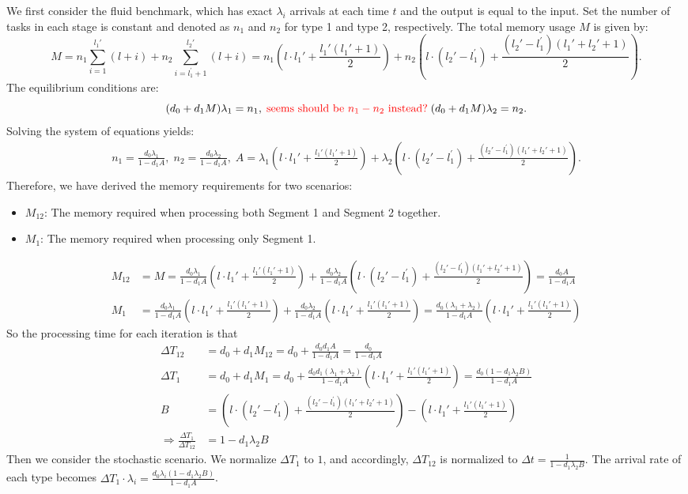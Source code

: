 \documentclass[opre, nonblindrev]{informs3} %
\begin{document}
We first consider the fluid benchmark, which has exact $\lambda_i$ arrivals at each time $t$ and the
output is equal to the input. Set the number of tasks in each stage is constant and denoted as $n_1$ and $n_2$ for type 1 and type 2, respectively. The total memory usage $M$ is given by:
$$M = n_1 \sum_{i=1}^{l_1'} (l + i) + n_2 \sum_{i=l_1^{\prime}+1}^{l_2'} (l + i) = n_1 \left( l \cdot l_1' + \frac{l_1' (l_1' + 1)}{2} \right) + n_2 \left( l\cdot( l_2'-l_1^{\prime}) + \frac{(l_2'-l_1^{\prime} ) (l_1'+l_2' + 1)}{2} \right).$$
The equilibrium conditions are:
$$(d_0 + d_1 M) \lambda_1 = n_1,\;\textcolor{red}{\text{seems should be }n_1-n_2 \text{ instead?}} \; (d_0 + d_1 M) \lambda_2 = n_2.$$
Solving the system of equations yields:
\begin{align*}
    n_1 = \frac{d_0 \lambda_1}{1 - d_1 A},\;n_2 = \frac{d_0 \lambda_2}{1 - d_1 A},\;A = \lambda_1 \left( l \cdot l_1' + \frac{l_1' (l_1' + 1)}{2} \right) + \lambda_2 \left( l\cdot( l_2'-l_1^{\prime}) + \frac{(l_2'-l_1^{\prime} ) (l_1'+l_2' + 1)}{2} \right).
\end{align*}
Therefore, we have derived the memory requirements for two scenarios:
\begin{itemize}
    \item $M_{12}$: The memory required when processing both Segment 1 and Segment 2 together.
    \item $M_1$: The memory required when processing only Segment 1.
\end{itemize}
\begin{align*}
M_{12}&=M=\frac{d_0 \lambda_1}{1 - d_1 A} \left( l \cdot l_1' + \frac{l_1' (l_1' + 1)}{2} \right) +\frac{d_0 \lambda_2}{1 - d_1 A} \left( l\cdot( l_2'-l_1^{\prime}) + \frac{(l_2'-l_1^{\prime} ) (l_1'+l_2' + 1)}{2} \right)=\frac{d_0 A}{1 - d_1 A}\\
M_{1}&=\frac{d_0 \lambda_1}{1 - d_1 A} \left( l \cdot l_1' + \frac{l_1' (l_1' + 1)}{2} \right) +\frac{d_0 \lambda_2}{1 - d_1 A} \left( l \cdot l_1' + \frac{l_1' (l_1' + 1)}{2} \right)=\frac{d_0 (\lambda_1+\lambda_2)}{1 - d_1 A}\left( l \cdot l_1' + \frac{l_1' (l_1' + 1)}{2} \right)
\end{align*}
So the processing time for each iteration is that
\begin{align*}
    \Delta T_{12} &= d_0+d_1M_{12}=d_0+\frac{d_0 d_1 A}{1 - d_1 A}=\frac{d_0 }{1 - d_1 A}\\
    \Delta T_{1} &= d_0+d_1M_{1}=d_0+\frac{d_0 d_1 (\lambda_1+\lambda_2)}{1 - d_1 A}\left( l \cdot l_1' + \frac{l_1' (l_1' + 1)}{2} \right)=\frac{d_0 \left(1-d_1\lambda_2B\right)}{1 - d_1 A}\\
    B&=\left( l\cdot( l_2'-l_1^{\prime}) + \frac{(l_2'-l_1^{\prime} ) (l_1'+l_2' + 1)}{2} \right)-\left( l \cdot l_1' + \frac{l_1' (l_1' + 1)}{2} \right)\\
    \Rightarrow \frac{\Delta T_{1}}{\Delta T_{12}}&= 1-d_1\lambda_2B
\end{align*}
Then we consider the stochastic scenario. We normalize $\Delta T_1$ to $1$, and accordingly, $\Delta T_{12}$ is normalized to $\Delta t = \frac{1}{1-d_1\lambda_2B}$. The arrival rate of each type becomes $\Delta T_1 \cdot \lambda_i = \frac{d_0 \lambda_i\left(1-d_1\lambda_2B\right)}{1 - d_1 A}$.
\end{document}
